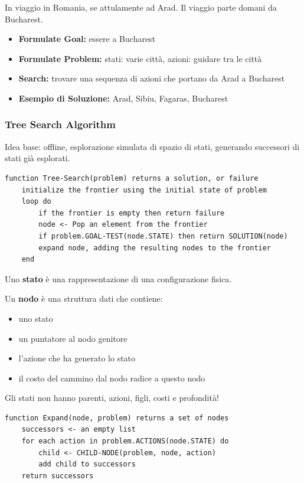 \documentclass[a4paper]{article}
\begin{document}
{
    In viaggio in Romania, se attulamente ad Arad.
    Il viaggio parte domani da Bucharest.
    \begin{itemize}
        \item \textbf{Formulate Goal:} essere a Bucharest
        \item \textbf{Formulate Problem:} stati: varie città, azioni: guidare tra le città
        \item \textbf{Search:} trovare una sequenza di azioni che portano da Arad a Bucharest
        \item \textbf{Esempio di Soluzione:} Arad, Sibiu, Fagaras, Bucharest
    \end{itemize}
}

\subsubsection{Tree Search Algorithm}

Idea base: offline, esplorazione simulata di spazio di stati, generando
successori di stati già esplorati.
\begin{verbatim}
function Tree-Search(problem) returns a solution, or failure
    initialize the frontier using the initial state of problem
    loop do
        if the frontier is empty then return failure
        node <- Pop an element from the frontier
        if problem.GOAL-TEST(node.STATE) then return SOLUTION(node)
        expand node, adding the resulting nodes to the frontier
    end
\end{verbatim}

\dfn{}
{
    Uno \textbf{stato} è una rappresentazione di una configurazione
    fisica.
}
\dfn{}
{
    Un \textbf{nodo} è una struttura dati che contiene:
    \begin{itemize}
        \item uno stato
        \item un puntatore al nodo genitore
        \item l'azione che ha generato lo stato
        \item il costo del cammino dal nodo radice a questo nodo
    \end{itemize}
    Gli stati non hanno parenti, azioni, figli, costi e profondità!
}

\begin{verbatim}
function Expand(node, problem) returns a set of nodes
    successors <- an empty list
    for each action in problem.ACTIONS(node.STATE) do
        child <- CHILD-NODE(problem, node, action)
        add child to successors
    return successors    
\end{verbatim}
\noindent
\end{document}
